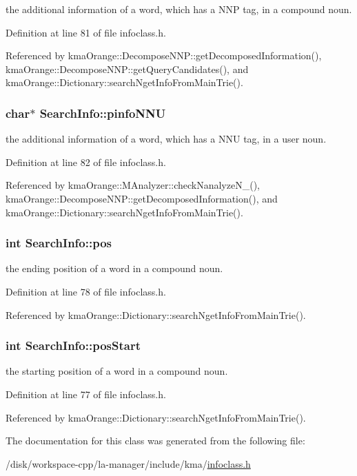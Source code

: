 the additional information of a word, which has a NNP tag, in a compound noun. 



Definition at line 81 of file infoclass.h.

Referenced by kmaOrange::DecomposeNNP::getDecomposedInformation(), kmaOrange::DecomposeNNP::getQueryCandidates(), and kmaOrange::Dictionary::searchNgetInfoFromMainTrie().\hypertarget{classSearchInfo_2ea8a9d4ac4564debbb0a00105be5b59}{
\subsubsection[{pinfoNNU}]{\setlength{\rightskip}{0pt plus 5cm}char$\ast$ {\bf SearchInfo::pinfoNNU}}}
\label{classSearchInfo_2ea8a9d4ac4564debbb0a00105be5b59}


the additional information of a word, which has a NNU tag, in a user noun. 



Definition at line 82 of file infoclass.h.

Referenced by kmaOrange::MAnalyzer::checkNanalyzeN\_\-(), kmaOrange::DecomposeNNP::getDecomposedInformation(), and kmaOrange::Dictionary::searchNgetInfoFromMainTrie().\hypertarget{classSearchInfo_9e2641d39b3de2afeb7291f733c54623}{
\subsubsection[{pos}]{\setlength{\rightskip}{0pt plus 5cm}int {\bf SearchInfo::pos}}}
\label{classSearchInfo_9e2641d39b3de2afeb7291f733c54623}


the ending position of a word in a compound noun. 



Definition at line 78 of file infoclass.h.

Referenced by kmaOrange::Dictionary::searchNgetInfoFromMainTrie().\hypertarget{classSearchInfo_2a955623e5f507d0c2df9f133821d171}{
\subsubsection[{posStart}]{\setlength{\rightskip}{0pt plus 5cm}int {\bf SearchInfo::posStart}}}
\label{classSearchInfo_2a955623e5f507d0c2df9f133821d171}


the starting position of a word in a compound noun. 



Definition at line 77 of file infoclass.h.

Referenced by kmaOrange::Dictionary::searchNgetInfoFromMainTrie().

The documentation for this class was generated from the following file:\begin{CompactItemize}
\item 
/disk/workspace-cpp/la-manager/include/kma/\hyperlink{infoclass_8h}{infoclass.h}\end{CompactItemize}
